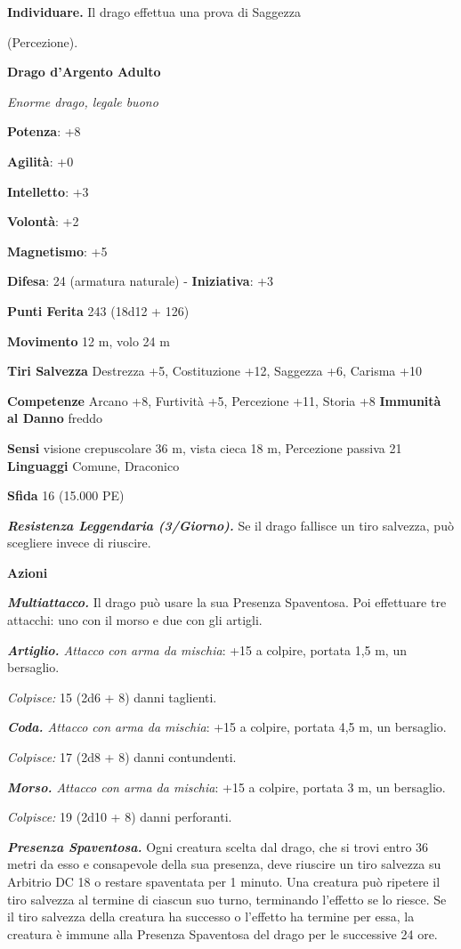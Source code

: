 \begin{multicols}{2}
\textbf{Individuare.} Il drago effettua una prova di Saggezza

(Percezione).



\textbf{Drago d'Argento Adulto}

\emph{Enorme drago, legale buono}

\textbf{Potenza}: +8

\textbf{Agilità}: +0

\textbf{Intelletto}: +3

\textbf{Volontà}: +2

\textbf{Magnetismo}: +5

\textbf{Difesa}: 24 (armatura naturale) - \textbf{Iniziativa}: +3

\textbf{Punti Ferita} 243 (18d12 + 126)

\textbf{Movimento} 12 m, volo 24 m

\textbf{Tiri Salvezza} Destrezza +5, Costituzione +12, Saggezza +6,
Carisma +10

\textbf{Competenze} Arcano +8, Furtività +5, Percezione +11, Storia +8
\textbf{Immunità al Danno} freddo

\textbf{Sensi} visione crepuscolare 36 m, vista cieca 18 m, Percezione passiva
21 \textbf{Linguaggi} Comune, Draconico

\textbf{Sfida} 16 (15.000 PE)

\emph{\textbf{Resistenza Leggendaria (3/Giorno).}} Se il drago fallisce
un tiro salvezza, può scegliere invece di riuscire.

\textbf{Azioni}

\emph{\textbf{Multiattacco.}} Il drago può usare la sua Presenza
Spaventosa. Poi effettuare tre attacchi: uno con il morso e due con gli
artigli.

\emph{\textbf{Artiglio.} Attacco con arma da mischia}: +15 a colpire,
portata 1,5 m, un bersaglio.

\emph{Colpisce:} 15 (2d6 + 8) danni taglienti.

\emph{\textbf{Coda.} Attacco con arma da mischia}: +15 a colpire,
portata 4,5 m, un bersaglio.

\emph{Colpisce:} 17 (2d8 + 8) danni contundenti.

\emph{\textbf{Morso.} Attacco con arma da mischia}: +15 a colpire,
portata 3 m, un bersaglio.

\emph{Colpisce:} 19 (2d10 + 8) danni perforanti.

\emph{\textbf{Presenza Spaventosa.}} Ogni creatura scelta dal drago, che
si trovi entro 36 metri da esso e consapevole della sua presenza, deve
riuscire un tiro salvezza su Arbitrio DC 18 o restare spaventata per 1
minuto. Una creatura può ripetere il tiro salvezza al termine di ciascun
suo turno, terminando l'effetto se lo riesce. Se il tiro salvezza della
creatura ha successo o l'effetto ha termine per essa, la creatura è
immune alla Presenza Spaventosa del drago per le successive 24 ore.


\end{multicols}
